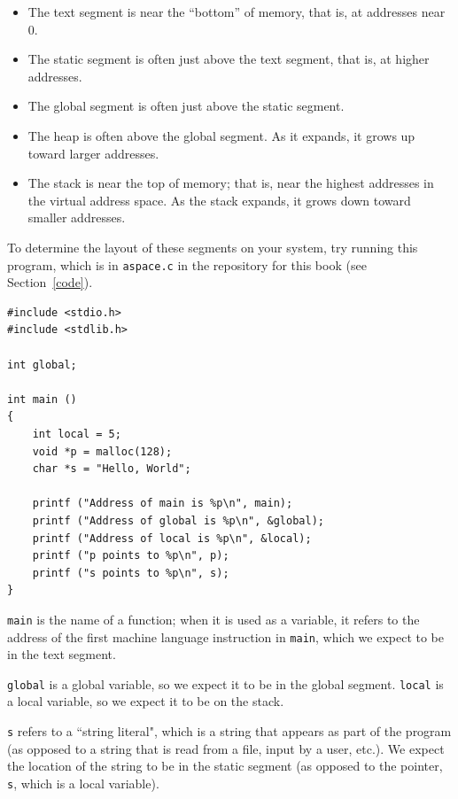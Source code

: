 \documentclass[12pt]{book}
\begin{document}
{\begin{itemize}

\item The text segment is near the ``bottom'' of memory, that is,
  at addresses near 0.

\item The static segment is often just above the text segment, that is,
at higher addresses.

\item The global segment is often just above the static segment.

\item The heap is often above the global segment.  As it expands,
  it grows up toward larger addresses.
  
\item The stack is near the top of memory; that is, near the
  highest addresses in the virtual address space.  As the
  stack expands, it grows down toward smaller addresses.

\end{itemize}


To determine the layout of these segments on your system, try running
this program, which is in {\tt aspace.c} in the repository for this
book (see Section~\ref{code}).

\begin{verbatim}
#include <stdio.h>
#include <stdlib.h>

int global;

int main ()
{
    int local = 5;
    void *p = malloc(128);
    char *s = "Hello, World";

    printf ("Address of main is %p\n", main);
    printf ("Address of global is %p\n", &global);
    printf ("Address of local is %p\n", &local);
    printf ("p points to %p\n", p);
    printf ("s points to %p\n", s);
}
\end{verbatim}

{\tt main} is the name of a function; when it is used as a variable,
it refers to the address of the first machine language instruction
in {\tt main}, which we expect to be in the text segment.

{\tt global} is a global variable, so we expect it to be in the
global segment.  {\tt local} is a local variable, so we expect it
to be on the stack.

{\tt s} refers to a ``string literal", which is a string that appears
as part of the program (as opposed to a string that is read from a file,
input by a user, etc.).  We expect the location of the string to be
in the static segment (as opposed to the pointer, {\tt s}, which is
a local variable).

}
\end{document}
